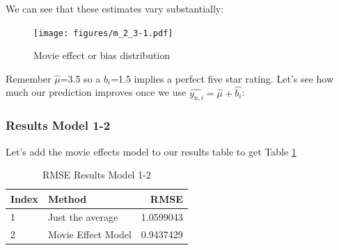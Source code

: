 \documentclass[
]{article}
\newenvironment{Shaded}{}{}
\newcommand{\AttributeTok}[1]{\textcolor[rgb]{0.49,0.56,0.16}{#1}}
\newcommand{\DecValTok}[1]{\textcolor[rgb]{0.25,0.63,0.44}{#1}}
\newcommand{\FloatTok}[1]{\textcolor[rgb]{0.25,0.63,0.44}{#1}}
\newcommand{\FunctionTok}[1]{\textcolor[rgb]{0.02,0.16,0.49}{#1}}
\newcommand{\NormalTok}[1]{#1}
\newcommand{\OtherTok}[1]{\textcolor[rgb]{0.00,0.44,0.13}{#1}}
\newcommand{\SpecialCharTok}[1]{\textcolor[rgb]{0.25,0.44,0.63}{#1}}
\newcommand{\StringTok}[1]{\textcolor[rgb]{0.25,0.44,0.63}{#1}}
\begin{document}
\newpage

We can see that these estimates vary substantially:

\begin{figure}
\centering
\texttt{[image: figures/m\_2\_3-1.pdf]}
\caption{Movie effect or bias distribution\label{fig:model_2}}
\end{figure}

Remember \(\hat{\mu}\)=3.5 so a \(b_{i}\)=1.5 implies a perfect five
star rating. Let's see how much our prediction improves once we use
\(\hat{y_{u,i}}=\hat{\mu}+\hat{b_{i}}\):

\begin{Shaded}
\end{Shaded}

\newpage

\hypertarget{results-model-1-2}{%
\subsubsection{Results Model 1-2}\label{results-model-1-2}}

Let's add the movie effects model to our results table to get Table
\ref{tbl:rmse_results_model_1-2}

\begin{table}[H]

\caption{\label{tab:m_2_5}RMSE Results Model 1-2\label{tbl:rmse_results_model_1-2}}
\centering
\fontsize{7}{9}\selectfont
\begin{tabular}[t]{llr}
\toprule
Index & Method & RMSE\\
\midrule
1 & Just the average & 1.0599043\\
2 & Movie Effect Model & 0.9437429\\
\bottomrule
\end{tabular}
\end{table}
\end{document}

